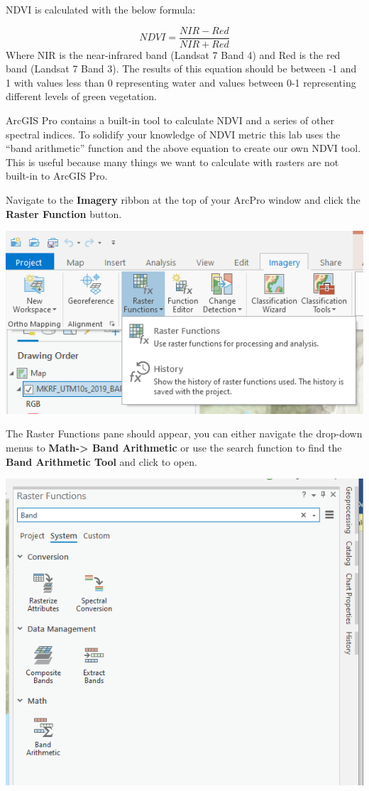 \documentclass[
]{book}
\begin{document}
NDVI is calculated with the below formula:

\[
NDVI=\frac{NIR-Red}{NIR+Red}
\]
Where NIR is the near-infrared band (Landsat 7 Band 4) and Red is the red band (Landsat 7 Band 3). The results of this equation should be between -1 and 1 with values less than 0 representing water and values between 0-1 representing different levels of green vegetation.

ArcGIS Pro contains a built-in tool to calculate NDVI and a series of other spectral indices. To solidify your knowledge of NDVI metric this lab uses the ``band arithmetic'' function and the above equation to create our own NDVI tool. This is useful because many things we want to calculate with rasters are not built-in to ArcGIS Pro.

Navigate to the \textbf{Imagery} ribbon at the top of your ArcPro window and click the \textbf{Raster Function} button.

\begin{center}\includegraphics[width=0.8\linewidth]{images/07-raster-functions} \end{center}

The Raster Functions pane should appear, you can either navigate the drop-down menus to \textbf{Math-\textgreater{} Band Arithmetic} or use the search function to find the \textbf{Band Arithmetic Tool} and click to open.

\begin{center}\includegraphics[width=0.8\linewidth]{images/07-band-arithmetic} \end{center}
\end{document}
